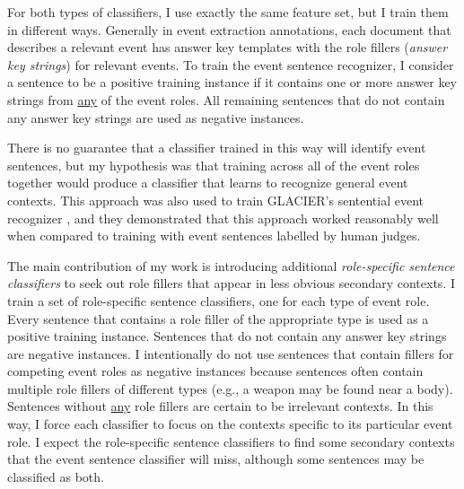For both types of classifiers, I use exactly the same feature set,
but I train them in different ways. 
Generally in event extraction annotations, each document that describes a relevant event has 
answer key templates with the role
fillers ({\it answer key strings}) for 
relevant events. To train the event
sentence recognizer, I consider a sentence to be a positive training
instance if it contains one or more answer key strings from \underline{any} of the
event roles.  
All
remaining sentences that do not contain any answer key 
strings are used as negative instances.  

 There is no guarantee that a classifier trained in this way will
 identify event sentences, but my hypothesis was that training across
 all of the event roles together would produce a classifier that learns to
 recognize general event contexts.  This approach was also used to
 train GLACIER's sentential event recognizer
 \cite{patwardhan-emnlp09}, and they demonstrated that this approach
 worked reasonably well when compared to training with event sentences labelled by human
 judges.

The main contribution of my work is introducing additional {\it
role-specific sentence classifiers} to seek out  role
fillers that appear in less obvious secondary contexts. 
%
I train a set
of role-specific sentence classifiers, one for each type of event role.
Every sentence that contains a role filler of the appropriate type
 is used as a positive training instance. Sentences that do not contain any answer key strings are negative
instances.
I intentionally do not use sentences that contain
  fillers for competing event roles as negative instances because 
  sentences often contain multiple role fillers of different types (e.g., a weapon
  may be found near a body). Sentences without \underline{any} role fillers
  are certain to be irrelevant contexts.
In this way, I force each classifier to focus on the contexts
specific to its particular event role.
I expect the role-specific
sentence classifiers to find some secondary contexts
that the event sentence classifier will miss, although some 
sentences may  be classified as both. 

